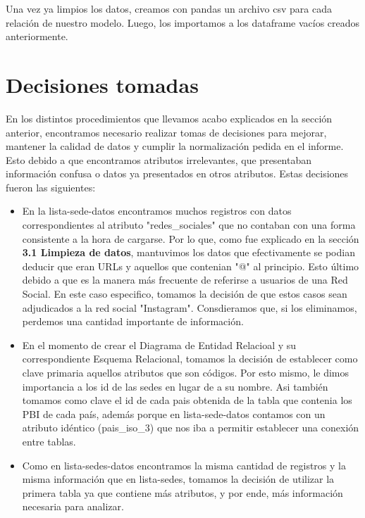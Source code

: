 \documentclass[10pt,a4paper]{article}
\begin{document}
Una vez ya limpios los datos, creamos con pandas un archivo csv para cada relación de nuestro modelo. Luego, los importamos 
a los dataframe vacíos creados anteriormente.

\section{Decisiones tomadas}

En los distintos procedimientos que llevamos acabo explicados en la sección anterior, encontramos necesario realizar tomas de decisiones para mejorar, mantener la calidad de datos y cumplir la normalización pedida en el informe. Esto debido a que encontramos atributos irrelevantes, que presentaban información confusa o datos ya presentados en otros atributos. Estas decisiones fueron las siguientes:
\begin{itemize}
    \item En la lista-sede-datos encontramos muchos registros con datos correspondientes al atributo "redes\_sociales" que no contaban con una forma consistente a la hora de cargarse. Por lo que, como fue explicado en la sección \textbf{3.1 Limpieza de datos}, mantuvimos los datos que efectivamente se podian deducir que eran URLs y aquellos que contenian "@" al principio. Esto último debido a que es la manera más frecuente de referirse a usuarios de una Red Social. En este caso especifico, tomamos la decisión de que estos casos sean adjudicados a la red social "Instagram". Consdieramos que, si los eliminamos, perdemos una cantidad importante de información.
    \item En el momento de crear el Diagrama de Entidad Relacioal y su correspondiente Esquema Relacional, tomamos la decisión de establecer como clave primaria aquellos atributos que son códigos. Por esto mismo, le dimos importancia a los id de las sedes en lugar de a su nombre. Asi también tomamos como clave el id de cada pais obtenida de la tabla que contenia los PBI de cada país, además porque en lista-sede-datos contamos con un atributo idéntico (pais\_iso\_3) que nos iba a permitir establecer una conexión entre tablas.
    \item Como en lista-sedes-datos encontramos la misma cantidad de registros y la misma información que en lista-sedes, tomamos la decisión de utilizar la primera tabla ya que contiene más atributos, y por ende, más información necesaria para analizar.
\end{itemize}
\end{document}

